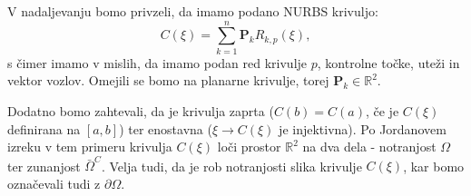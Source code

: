 \documentclass{article}
\begin{document}
V nadaljevanju bomo privzeli, da imamo podano NURBS krivuljo:
\begin{equation}
C(\xi) = \sum_{k=1}^n \textbf{P}_k R_{k,p}(\xi),
\end{equation}
s čimer imamo v mislih, da imamo podan red krivulje $p$, kontrolne točke, uteži in vektor vozlov. Omejili se bomo na planarne krivulje, torej $\textbf{P}_k \in \mathbb{R}^2$.

Dodatno bomo zahtevali, da je krivulja zaprta ($C(b) = C(a)$, če je $C(\xi)$ definirana na $[a,b]$) ter enostavna ($\xi \to C(\xi)$ je injektivna).
Po Jordanovem izreku v tem primeru krivulja $C(\xi)$ loči prostor $\mathbb{R}^2$ na dva dela - notranjost $\Omega$ ter zunanjost $\bar{\Omega}^C$. Velja tudi, da je rob notranjosti slika krivulje $C(\xi)$, kar bomo označevali tudi z $\partial \Omega$.
\end{document}
